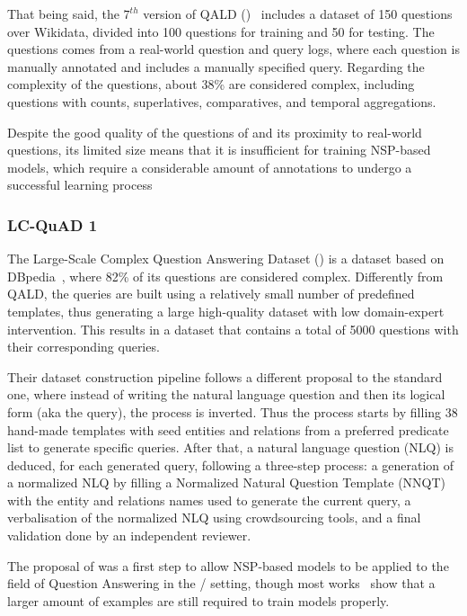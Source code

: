 That being said, the $7^{th}$ version of QALD (\QALDseven)~\cite{dataset:qald7-UsbeckNHKRN17} includes a 
dataset of 150 questions over Wikidata, divided into 100 questions for training and 50 for 
testing. The questions comes from a real-world question and query logs, where each question is 
manually annotated and includes a manually specified \SPARQL{} query. Regarding the complexity of 
the questions, about 38\% are considered complex, including questions with counts, superlatives, 
comparatives, and temporal aggregations.

Despite the good quality of the questions of \QALDseven{} and its proximity to real-world questions, 
its limited size means that it is insufficient for training NSP-based models, which require a 
considerable amount of annotations to undergo a successful learning process

\subsubsection{LC-QuAD 1}
\label{cap2:theoFrame/qakg/benchmarkDatasets/lcquad}
The Large-Scale Complex Question Answering Dataset (\LCQuADone{}) is a dataset based on 
DBpedia~\cite{dataset:lcquad-TrivediMDL17}, where 82\% of its questions are considered complex. 
Differently from QALD, the \SPARQL{} queries are built using a relatively small number of 
predefined templates, thus generating a large high-quality dataset with low domain-expert 
intervention. This results in a dataset that contains a total of 5000 questions with their 
corresponding queries.

Their dataset construction pipeline follows a different proposal to the standard one, where 
instead of writing the natural language question and then its logical form (aka the \SPARQL{} 
query), the process is inverted. Thus the process starts by filling 38 hand-made \SPARQL{} 
templates with seed entities and relations from a preferred predicate list to generate specific 
\SPARQL{} queries. After that, a natural language question (NLQ) is deduced, for each generated 
\SPARQL{} query, following a three-step process: a generation of a normalized NLQ by filling a 
Normalized Natural Question Template (NNQT) with the entity and relations names used to 
generate the current query, a verbalisation of the normalized NLQ using crowdsourcing tools, 
and a final validation done by an independent reviewer.

The proposal of \LCQuADone{} was a first step to allow NSP-based models to be applied to the field 
of Question Answering in the \RDF{}/\SPARQL{} setting, though most works~\cite{qa:FuQTLYS20abs-2007-13069} 
show that a larger amount of examples are still required to train models properly.


